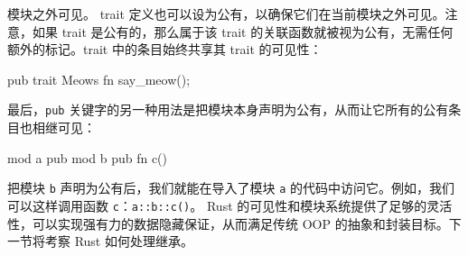 模块之外可见。
trait 定义也可以设为公有，以确保它们在当前模块之外可见。注意，如果 trait 是公有的，那么属于该 trait 的关联函数就被视为公有，无需任何额外的标记。trait 中的条目始终共享其 trait 的可见性：
\begin{codebox}[rust]
pub trait Meows {
      fn say_meow();
}
\end{codebox}
最后，\texttt{pub} 关键字的另一种用法是把模块本身声明为公有，从而让它所有的公有条目也相继可见：
\begin{codebox}[rust]
mod a {
    pub mod b {
        pub fn c() {
        }
    }
}
\end{codebox}
\label{idx:idx_c8c36d85}
把模块 \texttt{b} 声明为公有后，我们就能在导入了模块 \texttt{a} 的代码中访问它。例如，我们可以这样调用函数 \texttt{c}：\texttt{a::b::c()}。
Rust 的可见性和模块系统提供了足够的灵活性，可以实现强有力的数据隐藏保证，从而满足传统 OOP 的抽象和封装目标。下一节将考察 Rust 如何处理继承。
